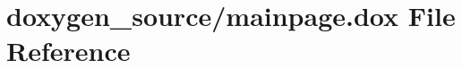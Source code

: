 \hypertarget{mainpage_8dox}{\section{doxygen\-\_\-source/mainpage.dox File Reference}
\label{mainpage_8dox}
}
